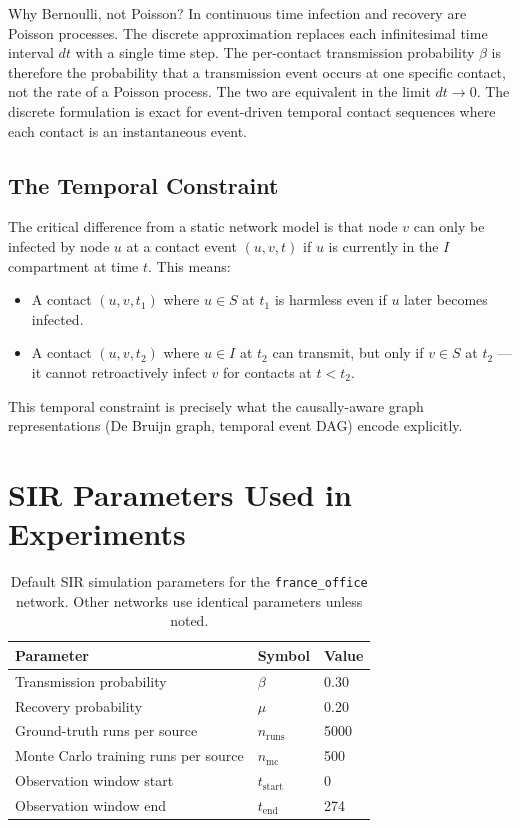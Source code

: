 \documentclass[12pt,a4paper]{report}
\begin{document}
\begin{insight}{Why Bernoulli, not Poisson?}
In continuous time infection and recovery are Poisson processes. The discrete
approximation replaces each infinitesimal time interval $dt$ with a single time
step. The per-contact transmission probability $\beta$ is therefore the
probability that a transmission event occurs at one specific contact, not the
rate of a Poisson process. The two are equivalent in the limit $dt \to 0$. The
discrete formulation is exact for event-driven temporal contact sequences where
each contact is an instantaneous event.
\end{insight}

\subsection{The Temporal Constraint}

The critical difference from a static network model is that node $v$ can only
be infected by node $u$ at a contact event $(u,v,t)$ if $u$ is currently in
the $I$ compartment at time $t$. This means:

\begin{itemize}[noitemsep]
  \item A contact $(u,v,t_1)$ where $u \in S$ at $t_1$ is harmless even if $u$
    later becomes infected.
  \item A contact $(u,v,t_2)$ where $u \in I$ at $t_2$ can transmit, but only
    if $v \in S$ at $t_2$ — it cannot retroactively infect $v$ for contacts at
    $t < t_2$.
\end{itemize}

This temporal constraint is precisely what the causally-aware graph
representations (De Bruijn graph, temporal event DAG) encode explicitly.

\section{SIR Parameters Used in Experiments}

\begin{table}[H]
\centering
\caption{Default SIR simulation parameters for the \texttt{france\_office}
  network. Other networks use identical parameters unless noted.}
\label{tab:sir_params}
\begin{tabular}{lll}
\toprule
Parameter & Symbol & Value \\
\midrule
Transmission probability & $\beta$ & 0.30 \\
Recovery probability & $\mu$ & 0.20 \\
Ground-truth runs per source & $n_{\text{runs}}$ & 5000 \\
Monte Carlo training runs per source & $n_{\text{mc}}$ & 500 \\
Observation window start & $t_{\text{start}}$ & 0 \\
Observation window end & $t_{\text{end}}$ & 274 \\
\bottomrule
\end{tabular}
\end{table}
\end{document}

